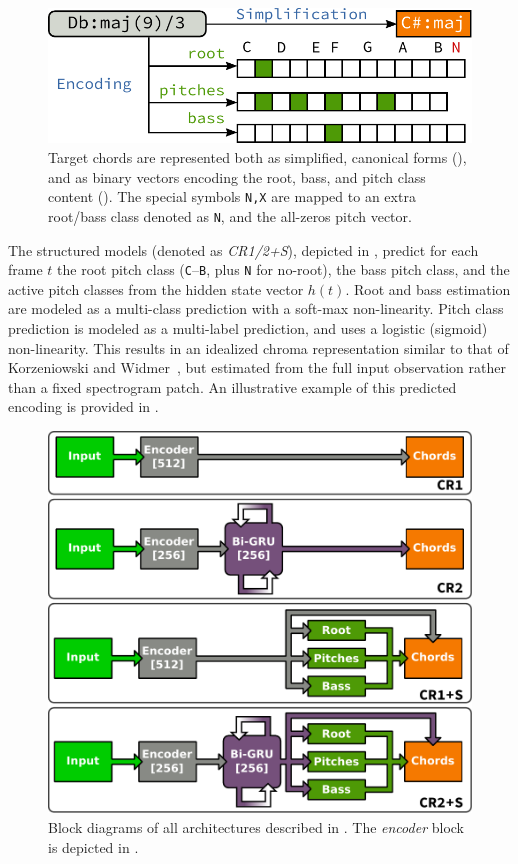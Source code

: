 \documentclass{article}
\begin{document}
\begin{figure}[t]
    \centering
    \includegraphics[width=0.9\columnwidth]{encoding}
    \caption{Target chords are represented both as simplified, canonical forms (), and as binary vectors encoding the root, bass, and pitch class content ().
    The special symbols \texttt{N,X} are mapped to an extra root/bass class denoted as \texttt{N}, and the all-zeros pitch vector.\label{fig:encoding}}
\end{figure}

The structured models (denoted as \emph{CR1/2+S}), depicted in , predict for each frame $t$ the root pitch class (\texttt{C}--\texttt{B}, plus \texttt{N} for no-root), the bass pitch class, and the active pitch classes from the hidden state vector $h(t)$.
Root and bass estimation are modeled as a multi-class prediction with a soft-max non-linearity.
Pitch class prediction is modeled as a multi-label prediction, and uses a logistic (sigmoid) non-linearity.
This results in an idealized chroma representation similar to that of Korzeniowski and Widmer~\cite{korzeniowski2016feature}, but estimated from the full input observation rather than a fixed spectrogram patch.
An illustrative example of this predicted encoding is provided in .

\begin{figure}[t]
    \centering
    \includegraphics[width=0.8\columnwidth]{architectures}
    \caption{Block diagrams of all architectures described in .
    The \emph{encoder} block is depicted in .\label{fig:architectures}}
\end{figure}
\end{document}
